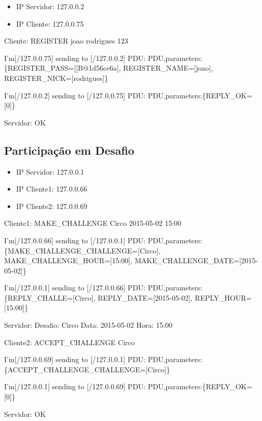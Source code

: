 \documentclass[runningheads,a4paper]{llncs}
\begin{document}
\begin{itemize}

\item IP Servidor: 127.0.0.2
\item IP Cliente: 127.0.0.75

\end{itemize}
Cliente: REGISTER joao rodrigues 123

I'm[/127.0.0.75] sending to [/127.0.0.2] PDU: PDU,parameters:\{REGISTER\_PASS=[[B@1d56ce6a], REGISTER\_NAME=[joao], REGISTER\_NICK=[rodrigues]\}

I'm[/127.0.0.2] sending to [/127.0.0.75] PDU: PDU,parameters:\{REPLY\_OK=[0]\}

Servidor: OK

\subsection{Participação em Desafio}

\begin{itemize}

\item IP Servidor: 127.0.0.1
\item IP Cliente1: 127.0.0.66
\item IP Cliente2: 127.0.0.69

\end{itemize}

Cliente1: MAKE\_CHALLENGE Circo 2015-05-02 15:00

I'm[/127.0.0.66] sending to [/127.0.0.1] PDU: PDU,parameters:\{MAKE\_CHALLENGE\_CHALLENGE=[Circo], MAKE\_CHALLENGE\_HOUR=[15:00], MAKE\_CHALLENGE\_DATE=[2015-05-02]\}

I'm[/127.0.0.1] sending to [/127.0.0.66] PDU: PDU,parameters:\{REPLY\_CHALLE=[Circo], REPLY\_DATE=[2015-05-02], REPLY\_HOUR=[15:00]\}

Servidor:  Desafio: Circo Data: 2015-05-02 Hora: 15:00

Cliente2: ACCEPT\_CHALLENGE Circo

I'm[/127.0.0.69] sending to [/127.0.0.1] PDU: PDU,parameters:\{ACCEPT\_CHALLENGE\_CHALLENGE=[Circo]\}

I'm[/127.0.0.1] sending to [/127.0.0.69] PDU: PDU,parameters:\{REPLY\_OK=[0]\}

Servidor: OK
\end{document}
